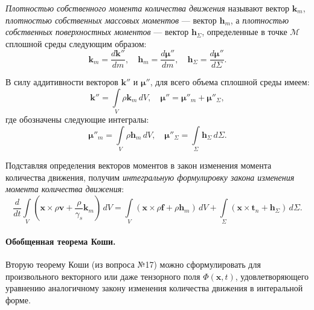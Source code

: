\begin{definition*}
	\textit{Плотностью собственного момента количества движения} называют вектор $\mathbf{k}_m$, \textit{плотностью собственных массовых моментов} --- вектор $\mathbf{h}_m$, а \textit{плотностью собственных поверхностных моментов} --- вектор $\mathbf{h}_{\Sigma}$, определенные в точке $\mathcal{M}$ сплошной среды следующим образом:
	\begin{equation*}
		\mathbf{k}_m = \frac{d\mathbf{k}''}{dm}, \quad \mathbf{h}_m = \frac{d\boldsymbol{\mu}''}{dm}, \quad \mathbf{h}_{\Sigma} = \frac{d\boldsymbol{\mu}''}{d\Sigma}.
	\end{equation*}
\end{definition*}

В силу аддитивности векторов $\mathbf{k}''$ и $\boldsymbol{\mu}''$, для всего объема сплошной среды имеем:
\begin{equation*}
	\mathbf{k}'' = \int\limits_{V} \rho \mathbf{k}_m \, dV, \quad \boldsymbol{\mu}'' = \boldsymbol{\mu}''_{m} + \boldsymbol{\mu}''_{\Sigma},
\end{equation*}
где обозначены следующие интегралы:
\begin{equation*}
	\boldsymbol{\mu}''_m = \int \limits_{V} \rho \mathbf{h}_m \, dV, \quad \boldsymbol{\mu}''_{\Sigma} = \int \limits_{\Sigma} \mathbf{h}_{\Sigma} \, d\Sigma.
\end{equation*}

Подставляя определения векторов моментов в закон изменения момента количества движения, получим \textit{интегральную формулировку закона изменения момента количества движения}:
\begin{equation*}
	\frac{d}{dt} \int\limits_{V} \left(\mathbf{x} \times \rho \mathbf{v} + \frac{\rho}{\gamma_s} \mathbf{k}_m\right) \, dV = \int\limits_{V} \left(\mathbf{x} \times \rho \mathbf{f} + \rho \mathbf{h}_{m}\right) \, dV + \int\limits_{\Sigma} \left(\mathbf{x} \times \mathbf{t}_n + \mathbf{h}_{\Sigma}\right) \, d\Sigma.
\end{equation*} 

\paragraph{Обобщенная теорема Коши.} Вторую теорему Коши (из вопроса №17) можно сформулировать для произвольного векторного или даже тензорного поля $\Phi(\mathbf{x}, t)$, удовлетворяющего уравнению аналогичному закону изменения количества движения в интеральной форме.

